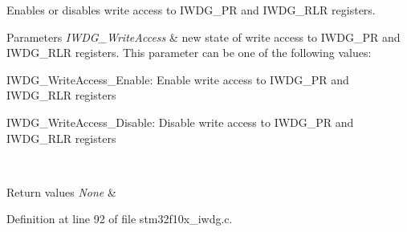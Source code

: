 Enables or disables write access to I\+W\+D\+G\+\_\+\+PR and I\+W\+D\+G\+\_\+\+R\+LR registers. 


\begin{DoxyParams}{Parameters}
{\em I\+W\+D\+G\+\_\+\+Write\+Access} & new state of write access to I\+W\+D\+G\+\_\+\+PR and I\+W\+D\+G\+\_\+\+R\+LR registers. This parameter can be one of the following values\+: \begin{DoxyItemize}
\item I\+W\+D\+G\+\_\+\+Write\+Access\+\_\+\+Enable\+: Enable write access to I\+W\+D\+G\+\_\+\+PR and I\+W\+D\+G\+\_\+\+R\+LR registers \item I\+W\+D\+G\+\_\+\+Write\+Access\+\_\+\+Disable\+: Disable write access to I\+W\+D\+G\+\_\+\+PR and I\+W\+D\+G\+\_\+\+R\+LR registers \end{DoxyItemize}
\\
\hline
\end{DoxyParams}

\begin{DoxyRetVals}{Return values}
{\em None} & \\
\hline
\end{DoxyRetVals}


Definition at line 92 of file stm32f10x\+\_\+iwdg.\+c.


